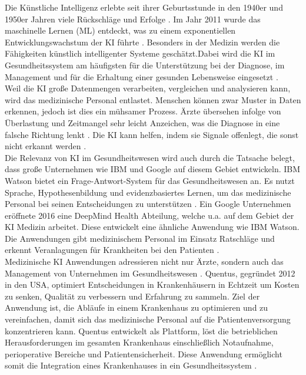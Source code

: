 Die Künstliche Intelligenz erlebte seit ihrer Geburtsstunde in den 1940er und 1950er Jahren viele Rückschläge und Erfolge \cite{Chapter_14}. Im Jahr 2011 wurde das maschinelle Lernen (ML) entdeckt, was zu einem exponentiellen Entwicklungswachstum der KI führte  \cite{Chapter_14}. Besonders in der Medizin werden die Fähigkeiten künstlich intelligenter Systeme geschätzt.Dabei wird die KI im Gesundheitssystem am häufigsten für die Unterstützung bei der Diagnose, im Management und für die Erhaltung einer gesunden Lebensweise eingesetzt \cite{Opportunities_challenges_ai_hc}.\\
Weil die KI große Datenmengen verarbeiten, vergleichen und analysieren kann, wird das medizinische Personal entlastet. Menschen können zwar Muster in Daten erkennen, jedoch ist dies ein mühsamer Prozess. Ärzte übersehen infolge von Überlastung und Zeitmangel sehr leicht Anzeichen, was die Diagnose in eine falsche Richtung lenkt \cite{Opportunities_challenges_ai_hc}. Die KI kann helfen, indem sie Signale offenlegt, die sonst nicht erkannt werden \cite{Opportunities_challenges_ai_hc}.\\
Die Relevanz von KI im Gesundheitswesen wird auch durch die Tatsache belegt, dass große Unternehmen wie IBM und Google auf diesem Gebiet entwickeln. IBM Watson bietet ein Frage-Antwort-System für das Gesundheitswesen an. Es nutzt Sprache, Hypothesenbildung und evidenzbasiertes Lernen, um das medizinische Personal bei seinen Entscheidungen zu unterstützen \cite{Opportunities_challenges_ai_hc}. Ein Google Unternehmen eröffnete 2016 eine DeepMind Health Abteilung, welche u.a. auf dem Gebiet der KI Medizin arbeitet. Diese entwickelt eine ähnliche Anwendung wie IBM Watson. Die Anwendungen gibt medizinischem Personal im Einsatz Ratschläge und erkennt Veranlagungen für Krankheiten bei den Patienten  \cite{Opportunities_challenges_ai_hc}.\\
Medizinische KI Anwendungen adressieren nicht nur Ärzte, sondern auch das Management von Unternehmen im Gesundheitswesen \cite{Opportunities_challenges_ai_hc}. Quentus, gegründet 2012 in den USA, optimiert Entscheidungen in Krankenhäusern in Echtzeit um Kosten zu senken, Qualität zu verbessern und Erfahrung zu sammeln. Ziel der Anwendung ist, die Abläufe in einem Krankenhaus zu optimieren und zu vereinfachen, damit sich das medizinische Personal auf die Patientenversorgung konzentrieren kann. Quentus entwickelt als Plattform, löst die betrieblichen Herausforderungen im gesamten Krankenhaus einschließlich Notaufnahme, perioperative Bereiche und Patientensicherheit. Diese Anwendung ermöglicht somit die Integration eines Krankenhauses in ein Gesundheitssystem \cite{Opportunities_challenges_ai_hc}.\\
